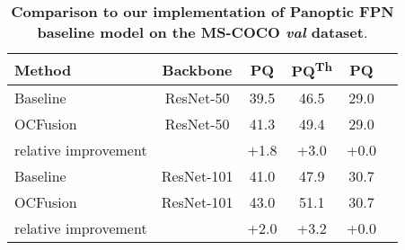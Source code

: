 \documentclass[10pt,twocolumn,letterpaper]{article}
\begin{document}
\begin{table}[!htp]
\vspace{-3mm}
\centering
\setlength{\tabcolsep}{3.0pt}
\begin{tabular}{@{}lccccc@{}}
\hline
\toprule
\textbf{Method} & \textbf{Backbone} & \textbf{PQ} & \textbf{PQ}\textsuperscript{Th} & \textbf{PQ} \\
\midrule
Baseline & ResNet-50 & 39.5 & 46.5 & 29.0 \\
OCFusion & ResNet-50 & 41.3 & 49.4 & 29.0 \\
\midrule
relative improvement & {} & +1.8 & +3.0 & +0.0 \\
\midrule
Baseline & ResNet-101 & 41.0 & 47.9 & 30.7 \\
OCFusion & ResNet-101 & 43.0 & 51.1 & 30.7 \\
\midrule
relative improvement & {} & +2.0 & +3.2 & +0.0 \\

\bottomrule
\hline
\end{tabular}
\vspace{-2mm}
\caption{\textbf{Comparison to our implementation of Panoptic FPN \cite{kirillov2019panoptic} baseline model on the MS-COCO \textit{val} dataset}.}
\label{table:coco_comp_baseline}
\vspace{-0mm}
\end{table}
\end{document}

